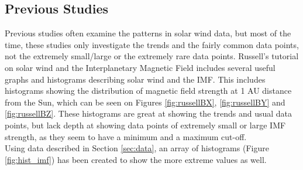 \documentclass[12pt]{article}
\begin{document}
    \subsection{Previous Studies}\label{sec:prevstudies}
        Previous studies often examine the patterns in solar wind data, but most of the time, these studies only investigate the trends and the fairly common data points, not the extremely small/large or the extremely rare data points. Russell's tutorial on solar wind and the Interplanetary Magnetic Field\cite{2001russell} includes several useful graphs and histograms describing solar wind and the IMF. This includes histograms showing the distribution of magnetic field strength at 1 AU distance from the Sun, which can be seen on Figures \ref{fig:russellBX}, \ref{fig:russellBY} and \ref{fig:russellBZ}. These histograms are great at showing the trends and usual data points, but lack depth at showing data points of extremely small or large IMF strength, as they seem to have a minimum and a maximum cut-off.\\
        Using data described in Section \ref{sec:data}, an array of histograms (Figure \ref{fig:hist_imf}) has been created to show the more extreme values as well.\\ \\ 
\end{document}
